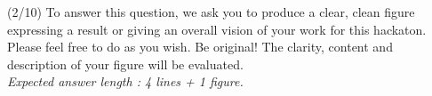 \documentclass [a4paper, 11pt] {article}
\begin{document}
\begin{question}{3.1}
(2/10) To answer this question, we ask you to produce a clear, clean figure expressing a result or giving an overall vision of your work for this hackaton. Please feel free to do as you wish. Be original! The clarity, content and description of your figure will be evaluated.\\
\textit{Expected answer length : 4 lines + 1 figure.}
\end{question}
\begin{answer}\color{blue}
\end{answer}
\pagebreak
\end{document}
